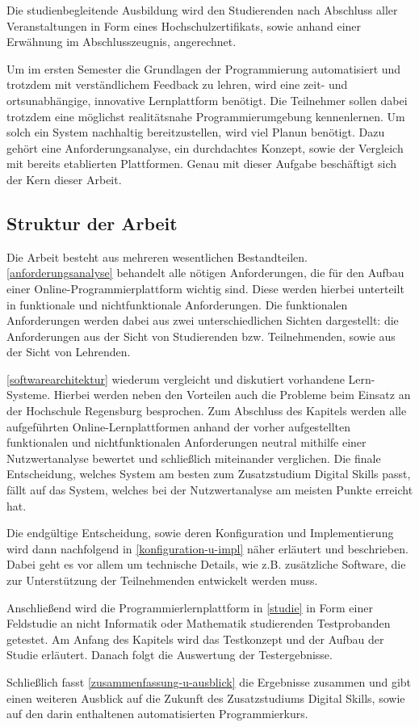 \newpage

Die studienbegleitende Ausbildung wird den Studierenden nach Abschluss aller
Veranstaltungen in Form eines Hochschulzertifikats, sowie anhand einer Erwähnung
im Abschlusszeugnis, angerechnet.

Um im ersten Semester die Grundlagen der Programmierung automatisiert und
trotzdem mit verständlichem Feedback zu lehren, wird eine zeit- und
ortsunabhängige, innovative Lernplattform benötigt. Die Teilnehmer sollen dabei
trotzdem eine möglichst realitätsnahe Programmierumgebung kennenlernen. Um solch
ein System nachhaltig bereitzustellen, wird viel Planun benötigt. Dazu gehört
eine Anforderungsanalyse, ein durchdachtes Konzept, sowie der Vergleich
mit bereits etablierten Plattformen. Genau mit dieser Aufgabe beschäftigt sich
der Kern dieser Arbeit.

\subsection{Struktur der Arbeit}\label{struktur-der-arbeit}
Die Arbeit besteht aus mehreren wesentlichen Bestandteilen.
\autoref{anforderungsanalyse} behandelt alle nötigen Anforderungen, die für den
Aufbau einer Online-Programmierplattform wichtig sind. Diese werden hierbei
unterteilt in funktionale und nichtfunktionale Anforderungen. Die funktionalen
Anforderungen werden dabei aus zwei unterschiedlichen Sichten dargestellt: die
Anforderungen aus der Sicht von Studierenden bzw. Teilnehmenden, sowie aus der
Sicht von Lehrenden.

\autoref{softwarearchitektur} wiederum vergleicht und diskutiert vorhandene
Lern-Systeme. Hierbei werden neben den Vorteilen auch die Probleme
beim Einsatz an der Hochschule Regensburg besprochen. Zum Abschluss des Kapitels
werden alle aufgeführten Online-Lernplattformen anhand der vorher aufgestellten
funktionalen und nichtfunktionalen Anforderungen neutral mithilfe einer
Nutzwertanalyse bewertet und schließlich miteinander verglichen. Die finale
Entscheidung, welches System am besten zum Zusatzstudium Digital Skills passt,
fällt auf das System, welches bei der Nutzwertanalyse am meisten Punkte erreicht
hat.

Die endgültige Entscheidung, sowie deren Konfiguration und Implementierung wird
dann nachfolgend in \autoref{konfiguration-u-impl} näher erläutert und
beschrieben. Dabei geht es vor allem um technische Details, wie z.B. zusätzliche
Software, die zur Unterstützung der Teilnehmenden entwickelt werden muss.

Anschließend wird die Programmierlernplattform in \autoref{studie} in Form
einer Feldstudie an nicht Informatik oder Mathematik studierenden Testprobanden
getestet. Am Anfang des Kapitels wird das Testkonzept und der Aufbau der Studie
erläutert. Danach folgt die Auswertung der Testergebnisse.

Schließlich fasst \autoref{zusammenfassung-u-ausblick} die Ergebnisse
zusammen und gibt einen weiteren Ausblick auf die Zukunft des Zusatzstudiums
Digital Skills, sowie auf den darin enthaltenen automatisierten Programmierkurs.